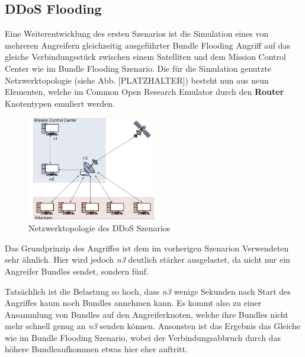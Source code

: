 \documentclass{article}
\begin{document}
\subsection{DDoS Flooding}
Eine Weiterentwicklung des ersten Szenarios ist die Simulation eines von mehreren Angreifern gleichzeitig ausgeführter Bundle Flooding Angriff auf das gleiche Verbindungsstück zwischen einem Satelliten und dem Mission Control Center wie im Bundle Flooding Szenario. Die für die Simulation genutzte Netzwerktopologie (siehe Abb. [PLATZHALTER]) besteht nun aus neun Elementen, welche im Common Open Research Emulator durch den \textbf{Router} Knotentypen emuliert werden.\par
\begin{figure}[h]
\centering
\includegraphics[width=0.5\textwidth]{ddos}
\caption{Netzwerktopologie des DDoS Szenarios}
\end{figure}
Das Grundprinzip des Angriffes ist dem im vorherigen Szenarion Verwendeten sehr ähnlich. Hier wird jedoch \textit{n3} deutlich stärker ausgelastet, da nicht nur ein Angreifer Bundles sendet, sondern fünf. \par
Tatsächlich ist die Belastung so hoch, dass \textit{n3} wenige Sekunden nach Start des Angriffes kaum noch Bundles annehmen kann. Es kommt also zu einer Ansammlung von Bundles auf den Angreiferknoten, welche ihre Bundles nicht mehr schnell genug an \textit{n3} senden können. Ansonsten ist das Ergebnis das Gleiche wie im Bundle Flooding Szenario, wobei der Verbindungsabbruch durch das höhere Bundleaufkommen etwas hier eher auftritt.
\end{document}
